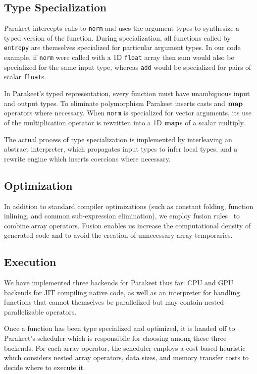 \documentclass[10pt,twocolumn]{article}
\begin{document}
\subsection{Type Specialization}
Parakeet intercepts calls to \lstinline{norm} and uses the argument types to synthesize a typed version of the function. During specialization, all functions called by \lstinline{entropy} are themselves specialized for particular argument types. In our code example, if \lstinline{norm} were called with a 1D \lstinline{float} array then sum would also be specialized for the same input type, whereas \lstinline{add} would be specialized for pairs of scalar \lstinline{float}s.

In Parakeet's typed representation, every function must have unambiguous input and output types. To eliminate polymorphism Parakeet inserts casts and $\mbox{\textbf{map}}$ operators where necessary. When \lstinline{norm} is specialized for vector arguments, its use of the multiplication operator is rewritten into a 1D $\mbox{\textbf{map}}$s of a scalar multiply.

The actual process of type specialization is implemented by interleaving an abstract interpreter, which propagates input types to infer local types, and a rewrite engine which inserts coercions where necessary.

\subsection{Optimization}
In addition to standard compiler optimizations (such as constant folding, function inlining, and common sub-expression elimination), we employ fusion rules~\cite{AbuSufah79, Kennedy93, Jones01} to combine array operators. Fusion enables us increase the computational density of generated code and to avoid the creation of unnecessary array temporaries.

\subsection{Execution}
We have implemented three backends for Parakeet thus far: CPU and GPU backends for JIT compiling native code, as well as an interpreter for handling functions that cannot themselves be parallelized but may contain nested parallelizable operators.

Once a function has been type specialized and optimized, it is handed off to Parakeet's scheduler which is responsibile for choosing among these three backends.  For each array operator, the scheduler employs a cost-based heuristic which considers nested array operators, data sizes, and memory transfer costs to decide where to execute it.
\end{document}

